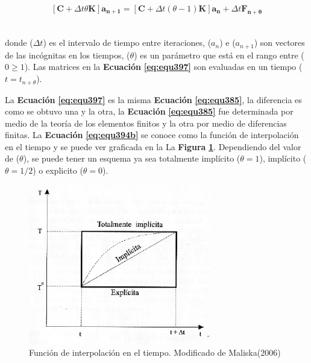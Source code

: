 \begin{ceqn} %
\begin{gather}\label{eq:equ397}
 [ \mathbf{C} + \Delta t\theta\mathbf{K}]\mathbf{a_{n+1}} = [ \mathbf{C} + \Delta t(\theta-1)\mathbf{K}]\mathbf{a_{n}} + \Delta t\mathbf{F_{n+\theta}}
\end{gather}   
\end{ceqn}
\\
donde ($\Delta t$) es el intervalo de tiempo entre iteraciones, ($a_n$) e ($a_{n+1}$) son vectores de las incógnitas en los tiempos, ($\theta$) es un parámetro que está en el rango entre ($0\geq1$). Las matrices en la \textbf{Ecuación} \textbf{\ref{eq:equ397}} son evaluadas en un tiempo ($t=t_{n+\theta}$).\bigskip

La \textbf{Ecuación} \textbf{\ref{eq:equ397}} es la misma \textbf{Ecuación} \textbf{\ref{eq:equ385}}, la diferencia es como se obtuvo una y la otra, la  \textbf{Ecuación} \textbf{\ref{eq:equ385}} fue determinada por medio de la teoría de los elementos finitos y la otra por medio de diferencias finitas. La \textbf{Ecuación} \textbf{\ref{eq:equ394b}} se conoce como la función de interpolación en el tiempo y se puede ver graficada en la La \textbf{Figura} \textbf{\ref{fig:fig34}}. Dependiendo del valor de ($\theta$), se puede tener un esquema ya sea totalmente implícito ($\theta = 1$), implícito ($\theta = 1/2$) o explicito ($\theta = 0$).\bigskip

\begin{figure}[!ht]
\centering
\includegraphics[width=8cm]{Imagenes/Funcion_Interpolacion.png}
\caption[Función de interpolación en el tiempo]{Función de interpolación en el tiempo. Modificado de Maliska(2006) \cite{Maliska2017TransferenciaEd..}}
\label{fig:fig34}
\end{figure}


